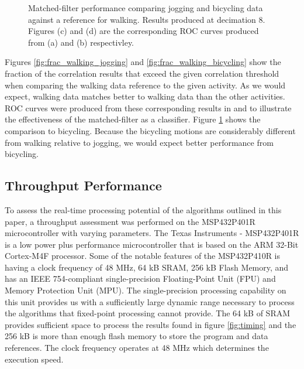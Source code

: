 \documentclass[journal]{IEEEtran}
\begin{document}
\begin{figure}[!ht]
  \quad
  \caption{Matched-filter performance comparing jogging and bicycling data against a reference for walking. Results produced at decimation 8. Figures (c) and (d) are the corresponding ROC curves produced from (a) and (b) respectivley.}
  \label{fig:MF_performance}
\end{figure}
%
Figures \ref{fig:frac_walking_jogging} and \ref{fig:frac_walking_bicycling} show the fraction of the correlation results that exceed the given correlation threshold when comparing the walking data reference to the given activity.
As we would expect, walking data matches better to walking data than the other activities.
ROC curves were produced from these corresponding results in  and  to illustrate the effectiveness of the matched-filter as a classifier.
Figure \ref{fig:MF_performance} shows the comparison to bicycling.
Because the bicycling motions are considerably different from walking relative to jogging, we would expect better performance from bicycling.
%
%
\subsection{Throughput Performance}
%
To assess the real-time processing potential of the algorithms outlined in this paper, a throughput assessment was performed on the MSP432P401R microcontroller with varying parameters.
The Texas Instruments - MSP432P401R is a low power plus performance microcontroller that is based on the ARM 32-Bit Cortex-M4F processor.
Some of the notable features of the MSP432P410R is having a clock frequency of 48 MHz, 64 kB SRAM, 256 kB Flash Memory, and has an IEEE 754-compliant single-precision Floating-Point Unit (FPU) and Memory Protection Unit (MPU).
The single-precision processing capability on this unit provides us with a sufficiently large dynamic range necessary to process the algorithms that fixed-point processing cannot provide.
The 64 kB of SRAM provides sufficient space to process the results found in figure \ref{fig:timing} and
the 256 kB is more than enough flash memory to store the program and data references.
The clock frequency operates at 48 MHz which determines the execution speed.
\end{document}
